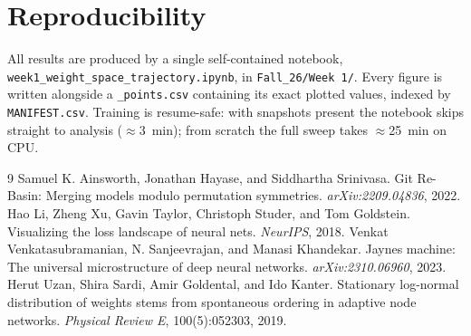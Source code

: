 \documentclass[11pt]{article}
\begin{document}
\section*{Reproducibility}

All results are produced by a single self-contained notebook,
\texttt{week1\_weight\_space\_trajectory.ipynb}, in \texttt{Fall\_26/Week 1/}. Every figure is
written alongside a \texttt{\_points.csv} containing its exact plotted values, indexed by
\texttt{MANIFEST.csv}. Training is resume-safe: with snapshots present the notebook skips
straight to analysis ($\approx$3~min); from scratch the full sweep takes $\approx$25~min on CPU.

\begin{thebibliography}{9}
 Samuel K. Ainsworth, Jonathan Hayase, and Siddhartha Srinivasa.
Git Re-Basin: Merging models modulo permutation symmetries. \emph{arXiv:2209.04836}, 2022.
 Hao Li, Zheng Xu, Gavin Taylor, Christoph Studer, and Tom Goldstein.
Visualizing the loss landscape of neural nets. \emph{NeurIPS}, 2018.
 Venkat Venkatasubramanian, N. Sanjeevrajan, and Manasi Khandekar.
Jaynes machine: The universal microstructure of deep neural networks.
\emph{arXiv:2310.06960}, 2023.
 Herut Uzan, Shira Sardi, Amir Goldental, and Ido Kanter. Stationary log-normal
distribution of weights stems from spontaneous ordering in adaptive node networks.
\emph{Physical Review E}, 100(5):052303, 2019.
\end{thebibliography}
\end{document}

